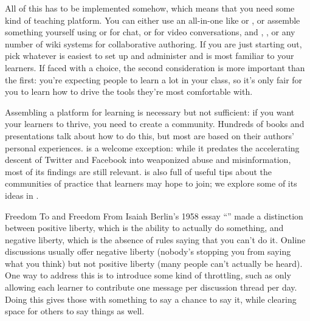 All of this has to be implemented somehow,
which means that you need some kind of teaching platform.
You can either use an all-in-one 
like  or ,
or assemble something yourself
using  or  for chat,
or  for video conversations,
and ,
,
or any number of wiki systems for collaborative authoring.
If you are just starting out,
pick whatever is easiest to set up and administer
and is most familiar to your learners.
If faced with a choice,
the second consideration is more important than the first:
you're expecting people to learn a lot in your class,
so it's only fair for you to learn how to drive the tools they're most comfortable with.

Assembling a platform for learning is necessary but not sufficient:
if you want your learners to thrive,
you need to create a community.
Hundreds of books and presentations talk about how to do this,
but most are based on their authors' personal experiences.
\cite{Krau2016} is a welcome exception:
while it predates the accelerating descent of Twitter and Facebook into weaponized abuse and misinformation,
most of its findings are still relevant.
\cite{Foge2005} is also full of useful tips
about the communities of practice that learners may hope to join;
we explore some of its ideas in .

\begin{aside}{Freedom To and Freedom From}
  Isaiah Berlin's 1958 essay ``''
  made a distinction between positive liberty,
  which is the ability to actually do something,
  and negative liberty,
  which is the absence of rules saying that you can't do it.
  Online discussions usually offer negative liberty
  (nobody's stopping you from saying what you think)
  but not positive liberty
  (many people can't actually be heard).
  One way to address this is to introduce some kind of throttling,
  such as only allowing each learner to contribute one message per discussion thread per day.
  Doing this gives those with something to say a chance to say it,
  while clearing space for others to say things as well.
\end{aside}

